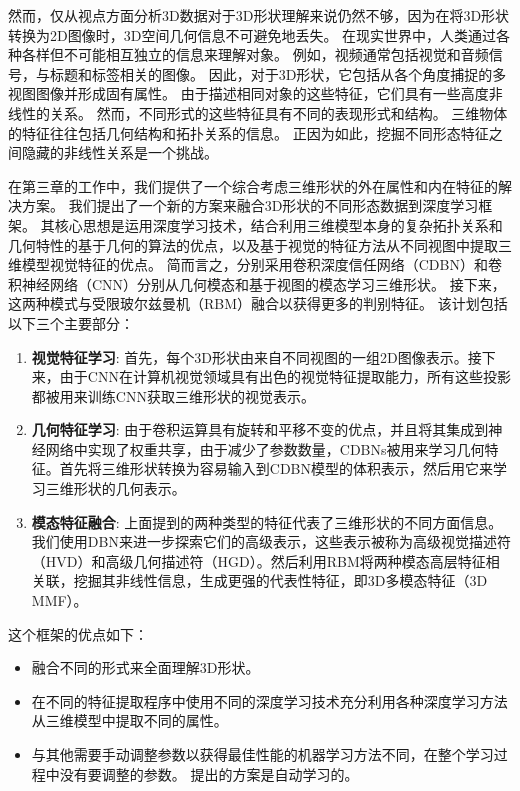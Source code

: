 然而，仅从视点方面分析3D数据对于3D形状理解来说仍然不够，因为在将3D形状转换为2D图像时，3D空间几何信息不可避免地丢失。 在现实世界中，人类通过各种各样但不可能相互独立的信息来理解对象。 例如，视频通常包括视觉和音频信号，与标题和标签相关的图像。 因此，对于3D形状，它包括从各个角度捕捉的多视图图像并形成固有属性。 由于描述相同对象的这些特征，它们具有一些高度非线性的关系。 然而，不同形式的这些特征具有不同的表现形式和结构。 三维物体的特征往往包括几何结构和拓扑关系的信息。 正因为如此，挖掘不同形态特征之间隐藏的非线性关系是一个挑战。

在第三章的工作中，我们提供了一个综合考虑三维形状的外在属性和内在特征的解决方案。 我们提出了一个新的方案来融合3D形状的不同形态数据到深度学习框架。 其核心思想是运用深度学习技术，结合利用三维模型本身的复杂拓扑关系和几何特性的基于几何的算法的优点，以及基于视觉的特征方法从不同视图中提取三维模型视觉特征的优点。 简而言之，分别采用卷积深度信任网络（CDBN）和卷积神经网络（CNN）分别从几何模态和基于视图的模态学习三维形状。 接下来，这两种模式与受限玻尔兹曼机（RBM）融合以获得更多的判别特征。 该计划包括以下三个主要部分：

\begin{enumerate}
\item \textbf{视觉特征学习}: 首先，每个3D形状由来自不同视图的一组2D图像表示。接下来，由于CNN在计算机视觉领域具有出色的视觉特征提取能力，所有这些投影都被用来训练CNN获取三维形状的视觉表示。
\item \textbf{几何特征学习}: 由于卷积运算具有旋转和平移不变的优点，并且将其集成到神经网络中实现了权重共享，由于减少了参数数量，CDBNs被用来学习几何特征。首先将三维形状转换为容易输入到CDBN模型的体积表示，然后用它来学习三维形状的几何表示。
\item \textbf{模态特征融合}: 上面提到的两种类型的特征代表了三维形状的不同方面信息。我们使用DBN来进一步探索它们的高级表示，这些表示被称为高级视觉描述符（HVD）和高级几何描述符（HGD）。然后利用RBM将两种模态高层特征相关联，挖掘其非线性信息，生成更强的代表性特征，即3D多模态特征（3D MMF）。
\end{enumerate}

这个框架的优点如下：
\begin{itemize}
\item 融合不同的形式来全面理解3D形状。
\item 在不同的特征提取程序中使用不同的深度学习技术充分利用各种深度学习方法从三维模型中提取不同的属性。
\item 与其他需要手动调整参数以获得最佳性能的机器学习方法不同，在整个学习过程中没有要调整的参数。 提出的方案是自动学习的。
\end{itemize}


